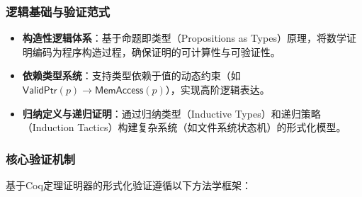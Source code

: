 \subsubsection{逻辑基础与验证范式}
\begin{itemize}
    \item \textbf{构造性逻辑体系}：基于命题即类型（Propositions as Types）原理，将数学证明编码为程序构造过程，确保证明的可计算性与可验证性。
    \item \textbf{依赖类型系统}：支持类型依赖于值的动态约束（如$\mathsf{ValidPtr}(p) \rightarrow \mathsf{MemAccess}(p)$），实现高阶逻辑表达。
    \item \textbf{归纳定义与递归证明}：通过归纳类型（Inductive Types）和递归策略（Induction Tactics）构建复杂系统（如文件系统状态机）的形式化模型。
\end{itemize}

\subsubsection{核心验证机制}
\label{subsubsec:coq-core}

基于Coq定理证明器的形式化验证遵循以下方法学框架：

